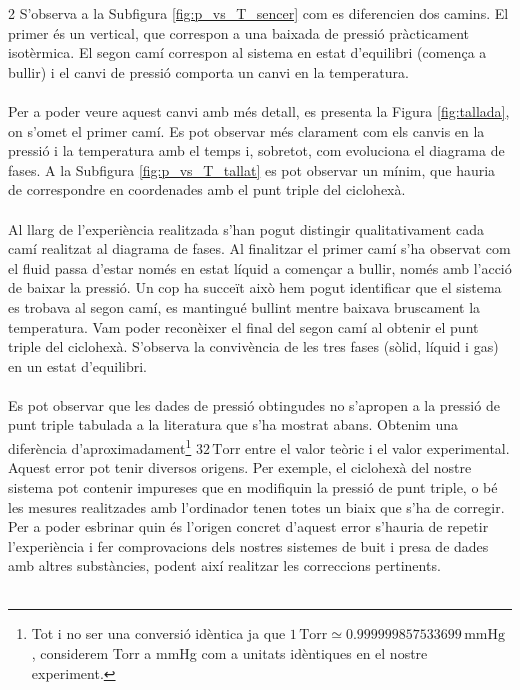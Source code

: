 \documentclass[12pt,twosides,onecolumn,openany]{article}
\begin{document}
\begin{multicols}{2}
S'observa a la Subfigura \ref{fig:p_vs_T_sencer} com es diferencien dos camins. El primer és un vertical, que correspon a una baixada de pressió pràcticament isotèrmica. El segon camí correspon al sistema en estat d'equilibri (comença a bullir) i el canvi de pressió comporta un canvi en la temperatura.\\\\ 
Per a poder veure aquest canvi amb més detall, es presenta la Figura \ref{fig:tallada}, on s'omet el primer camí. Es pot observar més clarament com els canvis en la pressió i la temperatura amb el temps i, sobretot, com evoluciona el diagrama de fases. A la Subfigura \ref{fig:p_vs_T_tallat} es pot observar un mínim, que hauria de correspondre en coordenades amb el punt triple del ciclohexà.\\\\
Al llarg de l'experiència realitzada s'han pogut distingir qualitativament cada camí realitzat al diagrama de fases. Al finalitzar el primer camí s'ha observat com el fluid passa d'estar només en estat líquid a començar a bullir, només amb l'acció de baixar la pressió. Un cop ha succeït això hem pogut identificar que el sistema es trobava al segon camí, es mantingué bullint mentre baixava bruscament la temperatura. Vam poder reconèixer el final del segon camí al obtenir el punt triple del ciclohexà. S'observa la convivència de les tres fases (sòlid, líquid i gas) en un estat d'equilibri.\\\\
Es pot observar que les dades de pressió obtingudes no s'apropen a la pressió de punt triple tabulada a la literatura que s'ha mostrat abans. Obtenim una diferència d'aproximadament\footnote{Tot i no ser una conversió idèntica ja que \(1\,\text{Torr} \simeq 0.999 999 857 533 699\, \text{mmHg}\) \cite{SI}, considerem Torr a mmHg com a unitats idèntiques en el nostre experiment.} \(32\,\text{Torr}\) entre el valor teòric i el valor experimental. Aquest error pot tenir diversos origens. Per exemple, el ciclohexà del nostre sistema pot contenir impureses que en modifiquin la pressió de punt triple, o bé les mesures realitzades amb l'ordinador tenen totes un biaix que s'ha de corregir. Per a poder esbrinar quin és l'origen concret d'aquest error s'hauria de repetir l'experiència i fer comprovacions dels nostres sistemes de buit i presa de dades amb altres substàncies, podent així realitzar les correccions pertinents.\\\\

\end{multicols}
\end{document}
